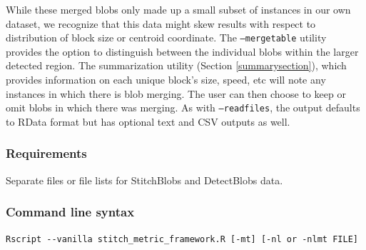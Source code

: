 \documentclass{article}
\begin{document}

While these merged blobs only made up a small subset of instances in our own dataset, we recognize that this data might skew results with respect to distribution of block size or centroid coordinate. The \texttt{--mergetable} utility provides the option to distinguish between the individual blobs within the larger detected region. The summarization utility (Section \ref{summarysection}), which provides information on each unique block's size, speed, etc will note any instances in which there is blob merging. The user can then choose to keep or omit blobs in which there was merging. As with \texttt{--readfiles}, the output defaults to RData format but has optional text and CSV outputs as well.

\subsubsection{Requirements}
Separate files or file lists for StitchBlobs and DetectBlobs data. %

\subsubsection{Command line syntax}
\begin{verbatim}
Rscript --vanilla stitch_metric_framework.R [-mt] [-nl or -nlmt FILE]
\end{verbatim}
\end{document}
